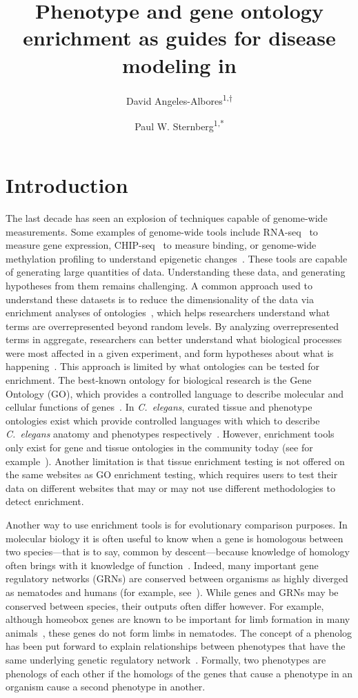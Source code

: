 \documentclass[10pt,letterpaper,twocolumn]{article}
\title{
  \Large
  \textbf{
  Phenotype and gene ontology enrichment as guides for disease modeling
  in \cel{}
          }
}
\author{David Angeles-Albores\textsuperscript{1,$\dagger{}$}
\and{}
Paul W. Sternberg\textsuperscript{1,*}
}
\newcommand{\cel}{\emph{C.~elegans}}
\begin{document}

\twocolumn[
\maketitle


]
\nolinenumbers{}

\section*{Introduction}
The last decade has seen an explosion of techniques capable of genome-wide
measurements. Some examples of genome-wide tools include RNA-seq~\cite{} to
measure gene expression, CHIP-seq~\cite{} to measure binding, or genome-wide
methylation profiling to understand epigenetic changes~\cite{}. These tools are capable
of generating large quantities of data. Understanding these data, and generating
hypotheses from them remains challenging. A common approach used to understand
these datasets is to reduce the dimensionality of the data via enrichment
analyses of ontologies~\cite{}, which helps researchers understand what terms are
overrepresented beyond random levels. By analyzing overrepresented terms in
aggregate, researchers can better understand what biological processes were most
affected in a given experiment, and form hypotheses about what is
happening~\cite{}.
This approach is limited by what ontologies can be tested for
enrichment.
The best-known ontology for biological research is the Gene Ontology (GO), which
provides a controlled language to describe molecular and cellular functions of
genes~\cite{}. In \cel{}, curated tissue and phenotype ontologies exist which provide
controlled languages with which to describe \cel{} anatomy and phenotypes
respectively~\cite{}. However, enrichment tools only exist for gene and tissue ontologies
in the community today (see for example~\cite{}). Another limitation is that tissue enrichment testing
is not offered on the same websites as GO enrichment testing, which requires
users to test their data on different websites that may or may not use different
methodologies to detect enrichment.

Another way to use enrichment tools is for evolutionary comparison purposes.
In molecular biology it is often useful to know when a gene is homologous
between two species---that is to say, common by descent---because knowledge of
homology often brings with it knowledge of function~\cite{}. Indeed, many
important gene regulatory networks (GRNs) are conserved between organisms as
highly diverged as nematodes and humans (for example, see~\cite{}). While genes
and GRNs may be conserved between species, their outputs often differ however.
For example, although homeobox genes are known to be important for limb
formation in many animals~\cite{}, these genes do not form limbs in nematodes.
The concept of a phenolog has been put forward to explain relationships between
phenotypes that have the same underlying genetic regulatory network~\cite{}.
Formally, two phenotypes are phenologs of each other if the homologs of the
genes that cause a phenotype in an organism cause a second phenotype in another.
\end{document}
